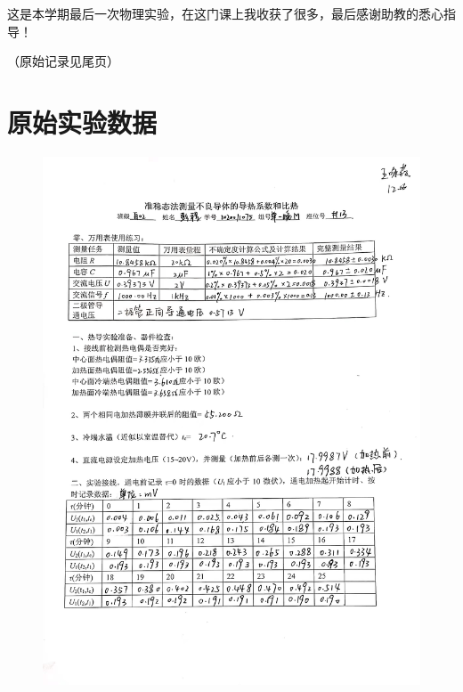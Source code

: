 \documentclass[UTF8]{ctexart}
\begin{document}
这是本学期最后一次物理实验，在这门课上我收获了很多，最后感谢助教的悉心指导！

（原始记录见尾页）

\section{原始实验数据}

\begin{figure}[H]
    \centering
    \includegraphics[scale=0.18]{原始记录.jpg}
\end{figure}
\end{document}
